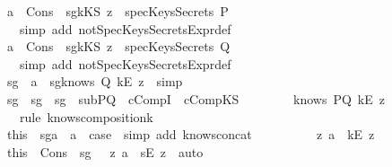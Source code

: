 \begin{isabellebody}
\ \ \ \ \isamarkupfalse \ a{}\ \ Cons\ \isamarkupfalse \ sg{}{\isacharcolon}{\isachardoublequoteopen}{\isacharparenleft}kKS\ z{\isacharparenright}\ {\isasymnotin}\ specKeysSecrets\ P{\isachardoublequoteclose}\isanewline
\ \ \ \ \ \ \isamarkupfalse \ {\isacharparenleft}simp\ add{\isacharcolon}\ notSpecKeysSecretsExpr{\isacharunderscore}def{\isacharparenright}\isanewline
\ \ \ \ \isamarkupfalse \ a{}\ \ Cons\ \isamarkupfalse \ sg{}{\isacharcolon}{\isachardoublequoteopen}{\isacharparenleft}kKS\ z{\isacharparenright}\ {\isasymnotin}\ specKeysSecrets\ Q{\isachardoublequoteclose}\isanewline
\ \ \ \ \ \ \isamarkupfalse \ {\isacharparenleft}simp\ add{\isacharcolon}\ notSpecKeysSecretsExpr{\isacharunderscore}def{\isacharparenright}\isanewline
\ \ \ \ \isamarkupfalse \ sg{}\ \ a{}\ \isamarkupfalse \ sg{}{\isacharcolon}{\isachardoublequoteopen}knows\ Q\ {\isacharbrackleft}kE\ z{\isacharbrackright}{\isachardoublequoteclose}\ \isamarkupfalse \ simp\isanewline
\ \ \ \ \isamarkupfalse \ sg{}\ \ sg{}\ \ sg{}\ \ subPQ\ \ cCompI\ \ cCompKS\ \isanewline
\ \ \ \ \ \ \isamarkupfalse \ {\isachardoublequoteopen}knows\ PQ\ {\isacharbrackleft}kE\ z{\isacharbrackright}{\isachardoublequoteclose}\ \isanewline
\ \ \ \ \ \ \isamarkupfalse \ {\isacharparenleft}rule\ knows{\isacharunderscore}composition{}{\isacharunderscore}k{\isacharparenright}\isanewline
\ \ \ \ \isamarkupfalse \ this\ \ sg{}a\ \ a{}\ \isamarkupfalse \ {\isacharquery}case\ \isamarkupfalse \ {\isacharparenleft}simp\ add{\isacharcolon}\ knows{\isacharunderscore}concat{\isacharunderscore}{}{\isacharparenright}\isanewline
\ \ \isamarkupfalse \ \isanewline
\ \ \ \ \isamarkupfalse \ {\isachardoublequoteopen}{\isasymnot}\ {\isacharparenleft}{\isasymexists}z{}{\isachardot}\ a\ {\isacharequal}\ kE\ z{}{\isacharparenright}{\isachardoublequoteclose}\isanewline
\ \ \ \ \isamarkupfalse \ this\ \ Cons\ \ sg{}\ \isamarkupfalse \ {\isachardoublequoteopen}{\isasymexists}\ z{}{\isachardot}\ a\ {\isacharequal}\ {\isacharparenleft}sE\ z{}{\isacharparenright}{\isachardoublequoteclose}\ \isamarkupfalse \ auto\isanewline

\end{isabellebody}
